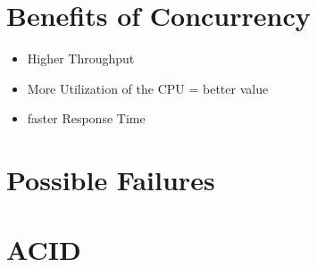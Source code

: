 	\section{Benefits of Concurrency}
		\begin{itemize}
			\item Higher Throughput
			\item More Utilization of the CPU = better value
			\item faster Response Time
		\end{itemize}
		
	\section{Possible Failures}
		
		
	\section{ACID}	
		
		
		
		
		
		
		
			
		